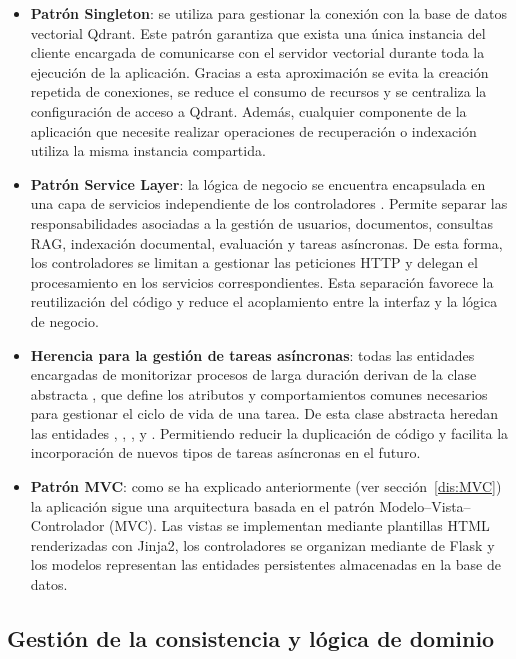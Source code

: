 \begin{itemize}
	\item \textbf{Patrón Singleton}: se utiliza para gestionar la conexión con la base de datos vectorial Qdrant. Este patrón garantiza que exista una única instancia del cliente encargada de comunicarse con el servidor vectorial durante toda la ejecución de la aplicación. Gracias a esta aproximación se evita la creación repetida de conexiones, se reduce el consumo de recursos y se centraliza la configuración de acceso a Qdrant. Además, cualquier componente de la aplicación que necesite realizar operaciones de recuperación o indexación utiliza la misma instancia compartida.
	\item \textbf{Patrón Service Layer}: la lógica de negocio se encuentra encapsulada en una capa de servicios independiente de los controladores . Permite separar las responsabilidades asociadas a la gestión de usuarios, documentos, consultas RAG, indexación documental, evaluación y tareas asíncronas. De esta forma, los controladores se limitan a gestionar las peticiones HTTP y delegan el procesamiento en los servicios correspondientes. Esta separación favorece la reutilización del código y reduce el acoplamiento entre la interfaz  y la lógica de negocio.
	\item \textbf{Herencia para la gestión de tareas asíncronas}: todas las entidades encargadas de monitorizar procesos de larga duración derivan de la clase abstracta , que define los atributos y comportamientos comunes necesarios para gestionar el ciclo de vida de una tarea. De esta clase abstracta heredan las entidades , , ,  y . Permitiendo reducir la duplicación de código y facilita la incorporación de nuevos tipos de tareas asíncronas en el futuro.
\item \textbf{Patrón MVC}: como se ha explicado anteriormente (ver sección~\ref{dis:MVC}) la aplicación  sigue una arquitectura basada en el patrón Modelo--Vista--Controlador (MVC). Las vistas se implementan mediante plantillas HTML renderizadas con Jinja2, los controladores se organizan mediante  de Flask y los modelos representan las entidades persistentes almacenadas en la base de datos.
\end{itemize}

\subsection{Gestión de la consistencia y lógica de dominio}

